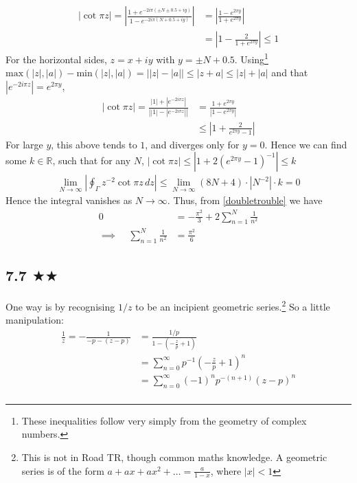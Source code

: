 \begin{align*}
|\cot \pi z|=\left|\frac{1+e^{-2i\pi(\pm N\pm 0.5+iy) }}{1-e^{-2i\pi (N+0.5+iy)}}\right|&=\left|\frac{1-e^{2\pi y}}{1+e^{2\pi y}}\right|\\
&=\left|1-\frac{2}{1+e^{2\pi y}}\right|\leq 1
\end{align*}
For the horizontal sides, $z=x+iy$ with $y=\pm N+0.5$. Using\footnote{These inequalities follow very simply from the geometry of complex numbers.} $\text{max}(|z|,|a|)-\text{min}(|z|,|a|)=\left| |z|-|a|\right|\leq |z+a|\leq |z|+|a|$ and that $|e^{-2i\pi z}|=e^{2\pi y}$,
\begin{align*}
|\cot \pi z|=\frac{|1|+|e^{-2i\pi z}|}{\left| |1|-|e^{-2i\pi z}|\right|}&=\frac{1+e^{2\pi y}}{\left| 1-e^{2\pi y }\right|}\\
&\leq\left|1+\frac{2}{ e^{2\pi y }-1}\right|
\end{align*}
For large $y$, this above tends to $1$, and diverges only for $y=0$. Hence we can find some $k\in \mathbb{R}$, such that for any $N$, $|\cot \pi z|\leq \left|1+2( e^{2\pi y }-1)^{-1}\right|\leq k$
\begin{align*}
\lim_{N\to\infty}\left|\oint_\Gamma z^{-2}\cot\pi z\, dz\right|\leq \lim_{N\to\infty}(8N+4)\cdot |N^{-2}|\cdot k=0
\end{align*}
Hence the integral vanishes as $N\to \infty$. Thus, from \eqref{doubletrouble} we have
\begin{align*}
0&=-\frac{\pi^2}{3}+2\sum^{N}_{n=1}\frac{1}{ n^2}\\
\implies  \ \ \ \ \ \sum^{N}_{n=1}\frac{1}{ n^2}&=\frac{\pi^2}{6}
\end{align*}


\subsection{7.7 $\bigstar\bigstar$}
One way is by recognising $1/z$ to be an incipient geometric series.\footnote{This is not in Road TR, though common maths knowledge. A geometric series is of the form $a+ax+ax^2+\ldots=\frac{a}{1-x}$, where $|x|<1$} So a little manipulation:
\begin{align*}
\frac{1}{z}= -\frac{1}{-p-(z-p)}&=\frac{1/p}{1-(-\frac{z}{p}+1)}\\
&=\sum_{n=0}^{\infty}p^{-1}(-\frac{z}{p}+1)^n\\
&=\sum_{n=0}^{\infty}(-1)^n p^{-(n+1)}(z-p)^n\\
\end{align*}


